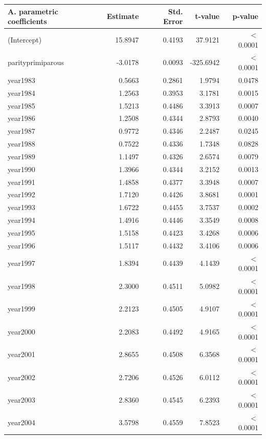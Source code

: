     \begin{table}[H]
    \centering
    \begin{tabular}{lrrrr}
    \textbf{A. parametric coefficients} & Estimate & Std. Error & t-value & p-value \\ 
       \hline
       \hline
      (Intercept) & 15.8947 & 0.4193 & 37.9121 & $<$ 0.0001 \\ 
      parityprimiparous & -3.0178 & 0.0093 & -325.6942 & $<$ 0.0001 \\ 
      year1983 & 0.5663 & 0.2861 & 1.9794 & 0.0478 \\ 
      year1984 & 1.2563 & 0.3953 & 3.1781 & 0.0015 \\ 
      year1985 & 1.5213 & 0.4486 & 3.3913 & 0.0007 \\ 
      year1986 & 1.2508 & 0.4344 & 2.8793 & 0.0040 \\ 
      year1987 & 0.9772 & 0.4346 & 2.2487 & 0.0245 \\ 
      year1988 & 0.7522 & 0.4336 & 1.7348 & 0.0828 \\ 
      year1989 & 1.1497 & 0.4326 & 2.6574 & 0.0079 \\ 
      year1990 & 1.3966 & 0.4344 & 3.2152 & 0.0013 \\ 
      year1991 & 1.4858 & 0.4377 & 3.3948 & 0.0007 \\ 
      year1992 & 1.7120 & 0.4426 & 3.8681 & 0.0001 \\ 
      year1993 & 1.6722 & 0.4455 & 3.7537 & 0.0002 \\ 
      year1994 & 1.4916 & 0.4446 & 3.3549 & 0.0008 \\ 
      year1995 & 1.5158 & 0.4423 & 3.4268 & 0.0006 \\ 
      year1996 & 1.5117 & 0.4432 & 3.4106 & 0.0006 \\ 
      year1997 & 1.8394 & 0.4439 & 4.1439 & $<$ 0.0001 \\ 
      year1998 & 2.3000 & 0.4511 & 5.0982 & $<$ 0.0001 \\ 
      year1999 & 2.2123 & 0.4505 & 4.9107 & $<$ 0.0001 \\ 
      year2000 & 2.2083 & 0.4492 & 4.9165 & $<$ 0.0001 \\ 
      year2001 & 2.8655 & 0.4508 & 6.3568 & $<$ 0.0001 \\ 
      year2002 & 2.7206 & 0.4526 & 6.0112 & $<$ 0.0001 \\ 
      year2003 & 2.8360 & 0.4545 & 6.2393 & $<$ 0.0001 \\ 
      year2004 & 3.5798 & 0.4559 & 7.8523 & $<$ 0.0001 \\ 

\end{tabular}
\end{table}
